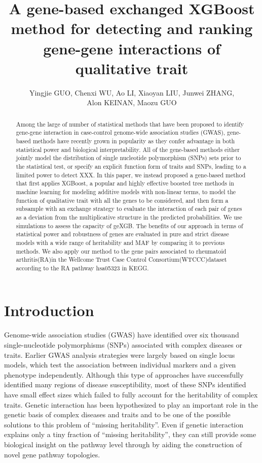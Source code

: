 \documentclass[11pt]{article}
\author{Yingjie GUO, Chenxi WU, Ao LI, Xiaoyan LIU, Junwei ZHANG,\\ Alon KEINAN, Maozu GUO}
\title{A gene-based exchanged XGBoost method for detecting and ranking gene-gene interactions of qualitative trait}
\theoremstyle{plain}
\theoremstyle{definition}
\theoremstyle{remark}
\begin{document}
\maketitle
\begin{abstract}
Among the large of number of statistical methods that have been proposed to identify gene-gene interaction in case-control genome-wide association studies (GWAS), gene-based methods have recently grown in popularity as they confer advantage in both statistical power and biological interpretability.
All of the gene-based methods either jointly model the distribution of single nucleotide polymorphism (SNPs) sets prior to the statistical test, or specify an explicit function form of traits and SNPs, leading to a limited power to detect XXX.
In this paper, we instead proposed a gene-based method that first applies XGBoost, a popular and highly effective boosted tree methods in machine learning for modeling additive models with non-linear terms, to model the function of qualitative trait with all the genes to be considered, and then form a subsample with an exchange strategy to evaluate the interaction of each pair of genes as a deviation from the multiplicative structure in the predicted probabilities.
We use simulations to assess the capacity of geXGB. The benefits of our approach in terms of statistical power and robustness of genes are evaluated in pure and strict disease models with a wide range of heritability and MAF by comparing it to previous methods. We also apply our method to the gene pairs associated to rheumatoid arthritis(RA)in the Wellcome Trust Case Control Consortium(WTCCC)dataset according to the RA pathway hsa05323 in KEGG.

\end{abstract}

\section{Introduction}

Genome-wide association studies (GWAS) have identified over six thousand single-nucleotide polymorphisms (SNPs) associated with complex diseases or traits. Earlier GWAS analysis strategies were largely based on single locus models, which test the association between individual markers and a given phenotype independently. Although this type of approaches have successfully identified many regions of disease susceptibility, most of these SNPs identified have small effect sizes which failed to fully account for the heritability of complex traits. Genetic interaction has been hypothesized to play an important role in the genetic basis of complex diseases and traits and to be one of the possible solutions to this problem of ``missing heritability''. Even if genetic interaction explains only a tiny fraction of ``missing heritability'', they can still provide some biological insight on the pathway level through by aiding the construction of novel gene pathway topologies.\\
\end{document}
